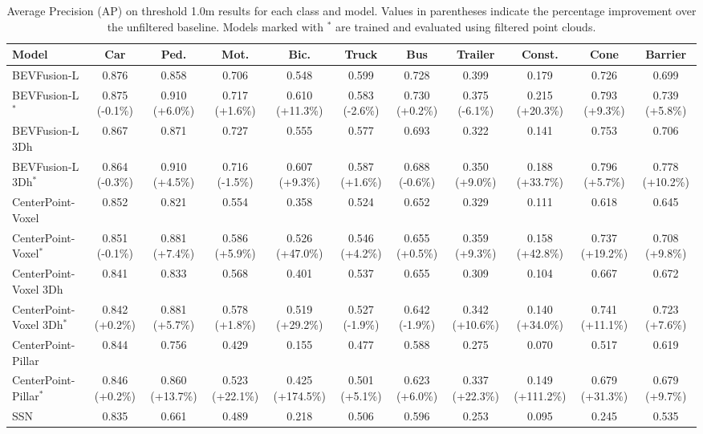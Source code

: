 
\begin{table}[htpb]
    \caption{Average Precision (AP) on threshold 1.0m results for each class and model. Values in parentheses indicate the percentage improvement over the unfiltered baseline. Models marked with $^*$ are trained and evaluated using filtered point clouds.}
    \centering
    \begin{tabular}{lcccccccccc}
    \midrule
    Model & Car & Ped. & Mot. & Bic. & Truck & Bus & Trailer & Const. & Cone & Barrier \\
    \midrule
    BEVFusion-L & 0.876 & 0.858 & 0.706 & 0.548 & 0.599 & 0.728 & 0.399 & 0.179 & 0.726 & 0.699 \\
    BEVFusion-L$^*$ & 0.875 (-0.1\%) & 0.910 (+6.0\%) & 0.717 (+1.6\%) & 0.610 (+11.3\%) & 0.583 (-2.6\%) & 0.730 (+0.2\%) & 0.375 (-6.1\%) & 0.215 (+20.3\%) & 0.793 (+9.3\%) & 0.739 (+5.8\%) \\
    \midrule
    BEVFusion-L 3Dh & 0.867 & 0.871 & 0.727 & 0.555 & 0.577 & 0.693 & 0.322 & 0.141 & 0.753 & 0.706 \\
    BEVFusion-L 3Dh$^*$ & 0.864 (-0.3\%) & 0.910 (+4.5\%) & 0.716 (-1.5\%) & 0.607 (+9.3\%) & 0.587 (+1.6\%) & 0.688 (-0.6\%) & 0.350 (+9.0\%) & 0.188 (+33.7\%) & 0.796 (+5.7\%) & 0.778 (+10.2\%) \\
    \midrule
    CenterPoint-Voxel & 0.852 & 0.821 & 0.554 & 0.358 & 0.524 & 0.652 & 0.329 & 0.111 & 0.618 & 0.645 \\
    CenterPoint-Voxel$^*$ & 0.851 (-0.1\%) & 0.881 (+7.4\%) & 0.586 (+5.9\%) & 0.526 (+47.0\%) & 0.546 (+4.2\%) & 0.655 (+0.5\%) & 0.359 (+9.3\%) & 0.158 (+42.8\%) & 0.737 (+19.2\%) & 0.708 (+9.8\%) \\
    \midrule
    CenterPoint-Voxel 3Dh & 0.841 & 0.833 & 0.568 & 0.401 & 0.537 & 0.655 & 0.309 & 0.104 & 0.667 & 0.672 \\
    CenterPoint-Voxel 3Dh$^*$ & 0.842 (+0.2\%) & 0.881 (+5.7\%) & 0.578 (+1.8\%) & 0.519 (+29.2\%) & 0.527 (-1.9\%) & 0.642 (-1.9\%) & 0.342 (+10.6\%) & 0.140 (+34.0\%) & 0.741 (+11.1\%) & 0.723 (+7.6\%) \\
    \midrule
    CenterPoint-Pillar & 0.844 & 0.756 & 0.429 & 0.155 & 0.477 & 0.588 & 0.275 & 0.070 & 0.517 & 0.619 \\
    CenterPoint-Pillar$^*$ & 0.846 (+0.2\%) & 0.860 (+13.7\%) & 0.523 (+22.1\%) & 0.425 (+174.5\%) & 0.501 (+5.1\%) & 0.623 (+6.0\%) & 0.337 (+22.3\%) & 0.149 (+111.2\%) & 0.679 (+31.3\%) & 0.679 (+9.7\%) \\
    \midrule
    SSN & 0.835 & 0.661 & 0.489 & 0.218 & 0.506 & 0.596 & 0.253 & 0.095 & 0.245 & 0.535 \\

\end{tabular}
\end{table}
